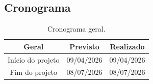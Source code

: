 \begin{landscape}

\chapter{Cronograma} 

\begin{table}[htpb]
\begin{center}
\caption{Cronograma geral.}
\begin{tabular}{|c|c|c|}
\hline
\textbf{Geral}          & \textbf{Previsto} & \textbf{Realizado} \\ \hline
Início do projeto       & 09/04/2026        & 09/04/2026         \\ \hline
Fim do projeto          & 08/07/2026        & 08/07/2026         \\ \hline
\end{tabular}
\end{center}
\end{table}

\newpage
\thispagestyle{empty}
\begin{table}[htpb]
\centering
\caption{Cronograma por atividade.}
\footnotesize
{}
\end{table}
\end{landscape}
